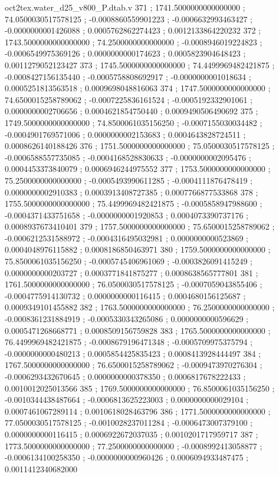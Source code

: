 \begin{filecontents}[overwrite]{oct2tex.water_d25_v800_P.dtab.v}
371 ; 1741.5000000000000000 ; 74.0500030517578125 ; -0.0008860559901223 ; -0.0006632993463427 ; -0.0000000001426088 ; 0.0005762862274423 ; 0.0012133864220232
372 ; 1743.5000000000000000 ; 74.2500000000000000 ; -0.0008946019224823 ; -0.0006549975369126 ; 0.0000000000174623 ; 0.0005823904648423 ; 0.0011279052123427
373 ; 1745.5000000000000000 ; 74.4499969482421875 ; -0.0008427156135440 ; -0.0005758808692917 ; -0.0000000001018634 ; 0.0005251813563518 ; 0.0009698048816063
374 ; 1747.5000000000000000 ; 74.6500015258789062 ; -0.0007225836161524 ; -0.0005192332901061 ; 0.0000000002706656 ; 0.0004621854750440 ; 0.0009490506490692
375 ; 1749.5000000000000000 ; 74.8500061035156250 ; -0.0007155030034482 ; -0.0004901769571006 ; 0.0000000002153683 ; 0.0004643828724511 ; 0.0008626140188426
376 ; 1751.5000000000000000 ; 75.0500030517578125 ; -0.0006588557735085 ; -0.0004168528830633 ; -0.0000000002095476 ; 0.0004453373840079 ; 0.0006946244975552
377 ; 1753.5000000000000000 ; 75.2500000000000000 ; -0.0005493990611285 ; -0.0004111876478419 ; 0.0000000002910383 ; 0.0003913408727385 ; 0.0007766877533868
378 ; 1755.5000000000000000 ; 75.4499969482421875 ; -0.0005858947988600 ; -0.0004371433751658 ; -0.0000000001920853 ; 0.0004073390737176 ; 0.0008937673410401
379 ; 1757.5000000000000000 ; 75.6500015258789062 ; -0.0006212531588972 ; -0.0004316495032981 ; 0.0000000000523869 ; 0.0004048976115882 ; 0.0008186850463971
380 ; 1759.5000000000000000 ; 75.8500061035156250 ; -0.0005745406961069 ; -0.0003826091415249 ; 0.0000000000203727 ; 0.0003771841875277 ; 0.0008638565777801
381 ; 1761.5000000000000000 ; 76.0500030517578125 ; -0.0007059043855406 ; -0.0004775914130732 ; 0.0000000000116415 ; 0.0004680156125687 ; 0.0009349101455882
382 ; 1763.5000000000000000 ; 76.2500000000000000 ; -0.0008361231884919 ; -0.0005330343265086 ; 0.0000000000596629 ; 0.0005471268668771 ; 0.0008509156759828
383 ; 1765.5000000000000000 ; 76.4499969482421875 ; -0.0008679196471348 ; -0.0005709975375794 ; -0.0000000000480213 ; 0.0005854425835423 ; 0.0008413928444497
384 ; 1767.5000000000000000 ; 76.6500015258789062 ; -0.0009473970276304 ; -0.0006293432670645 ; 0.0000000000378350 ; 0.0006817678222433 ; 0.0010012025013566
385 ; 1769.5000000000000000 ; 76.8500061035156250 ; -0.0010344438487664 ; -0.0006813625223003 ; 0.0000000000029104 ; 0.0007461067289114 ; 0.0010618028463796
386 ; 1771.5000000000000000 ; 77.0500030517578125 ; -0.0010028237011284 ; -0.0006473007379100 ; 0.0000000000116415 ; 0.0006922672037035 ; 0.0010201717959717
387 ; 1773.5000000000000000 ; 77.2500000000000000 ; -0.0008992413058877 ; -0.0006134100258350 ; -0.0000000000960426 ; 0.0006094933487475 ; 0.0011412340682000

\end{filecontents}
